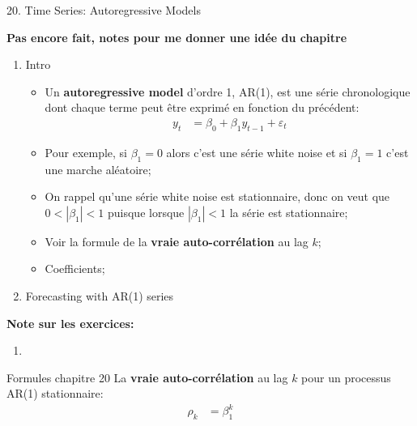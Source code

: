 \documentclass[12pt, titlepage, french]{report}
\begin{document}
\begin{CHPT_SUMM}{20. Time Series: Autoregressive Models}
\textbf{Pas encore fait, notes pour me donner une idée du chapitre}
\begin{enumerate}
	\item	Intro
	\begin{itemize}
		\item	Un \textbf{autoregressive model} d'ordre 1, AR(1), est une série chronologique dont chaque terme peut être exprimé en fonction du précédent:
		\begin{align*}
			y_{t}	&=	\beta_{0} + \beta_{1} y_{t - 1} + \varepsilon_{t}
		\end{align*}
		\item	Pour exemple, si $\beta_{1} = 0$ alors c'est une série white noise et si $\beta_{1} = 1$ c'est une marche aléatoire;
		\item	On rappel qu'une série white noise est stationnaire, donc on veut que $0 < | \beta_{1} | < 1$ puisque lorsque $| \beta_{1} | < 1$ la série est stationnaire;
		\item	Voir la formule de la \textbf{vraie auto-corrélation} au lag $k$;
		\item	Coefficients;
	\end{itemize}
	\item	Forecasting with AR(1) series
\end{enumerate}
\textbf{Note sur les exercices:} 
\begin{enumerate}
	\item	
\end{enumerate}
\end{CHPT_SUMM}

\begin{FORMULA_SUMM}{Formules chapitre 20}
La \textbf{vraie auto-corrélation} au lag $k$ pour un processus AR(1) stationnaire:
\begin{align*}
	\rho_{k}	&=	\beta_{1}^{k}
\end{align*}
\end{FORMULA_SUMM}
\end{document}
